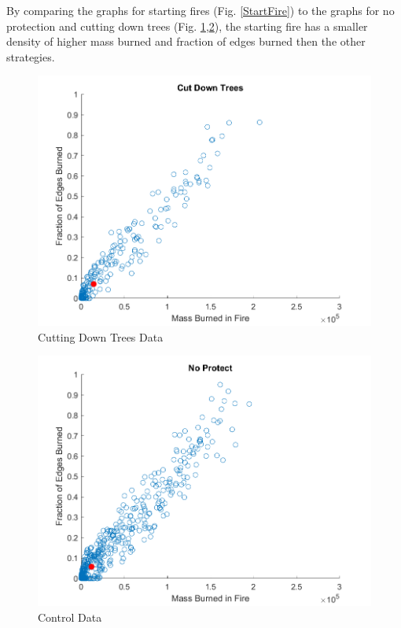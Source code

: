 \documentclass[ aps, pra, reprint, notitlepage ]{revtex4-1}
\begin{document}
By comparing the graphs for starting fires (Fig. \ref{StartFire}) to the graphs for no protection and cutting down trees (Fig. \ref{CutTrees},\ref{NoProtect}), the starting fire has a smaller density of higher mass burned and fraction of edges burned then the other strategies.

\begin{figure}[ht]
	\includegraphics[scale=0.6]{Data/CutDownTrees}
	\caption{\label{CutTrees} Cutting Down Trees Data}
\end{figure}
\begin{figure}[ht]
	\includegraphics[scale=0.6]{Data/NoProtect}
	\caption{\label{NoProtect} Control Data}
\end{figure}
\end{document}
